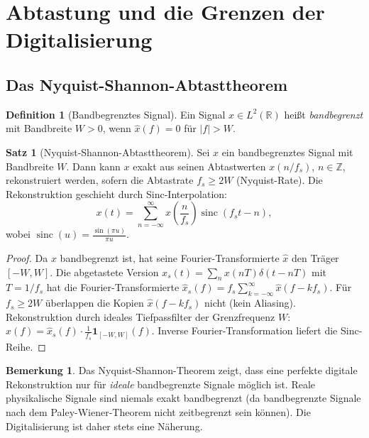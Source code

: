 ﻿\documentclass[a4paper,12pt]{article}
\theoremstyle{definition}
\newtheorem{definition}{Definition}
\newtheorem{satz}{Satz}
\newtheorem{bemerkung}{Bemerkung}
\begin{document}
\section{Abtastung und die Grenzen der Digitalisierung}
\label{sec:abtastung}

\subsection{Das Nyquist-Shannon-Abtasttheorem}

\begin{definition}[Bandbegrenztes Signal]
Ein Signal $x \in L^2(\mathbb{R})$ heißt \emph{bandbegrenzt} mit Bandbreite
$W > 0$, wenn $\hat{x}(f) = 0$ für $|f| > W$.
\end{definition}

\begin{satz}[Nyquist-Shannon-Abtasttheorem]
\label{satz:nyquist}
Sei $x$ ein bandbegrenztes Signal mit Bandbreite $W$.  Dann kann $x$ exakt aus
seinen Abtastwerten $x(n/f_s)$, $n \in \mathbb{Z}$, rekonstruiert werden,
sofern die Abtastrate $f_s \geq 2W$ (Nyquist-Rate).  Die Rekonstruktion
geschieht durch Sinc-Interpolation:
\[
x(t) = \sum_{n=-\infty}^{\infty} x\!\left(\frac{n}{f_s}\right) \operatorname{sinc}(f_s t - n),
\]
wobei $\operatorname{sinc}(u) = \frac{\sin(\pi u)}{\pi u}$.
\end{satz}

\begin{proof}
Da $x$ bandbegrenzt ist, hat seine Fourier-Transformierte $\hat{x}$ den Träger
$[-W, W]$.  Die abgetastete Version $x_s(t) = \sum_n x(nT)\delta(t-nT)$
mit $T = 1/f_s$ hat die Fourier-Transformierte
$\hat{x}_s(f) = f_s \sum_{k=-\infty}^\infty \hat{x}(f - kf_s)$.
Für $f_s \geq 2W$ überlappen die Kopien $\hat{x}(f - kf_s)$ nicht (kein Aliasing).
Rekonstruktion durch ideales Tiefpassfilter der Grenzfrequenz $W$:
$\hat{x}(f) = \hat{x}_s(f) \cdot \frac{1}{f_s} \mathbf{1}_{[-W,W]}(f)$.
Inverse Fourier-Transformation liefert die Sinc-Reihe.
\end{proof}

\begin{bemerkung}
Das Nyquist-Shannon-Theorem zeigt, dass eine perfekte digitale Rekonstruktion
nur für \emph{ideale} bandbegrenzte Signale möglich ist.  Reale physikalische
Signale sind niemals exakt bandbegrenzt (da bandbegrenzte Signale nach dem
Paley-Wiener-Theorem nicht zeitbegrenzt sein können).  Die Digitalisierung ist
daher stets eine Näherung.
\end{bemerkung}
\end{document}
